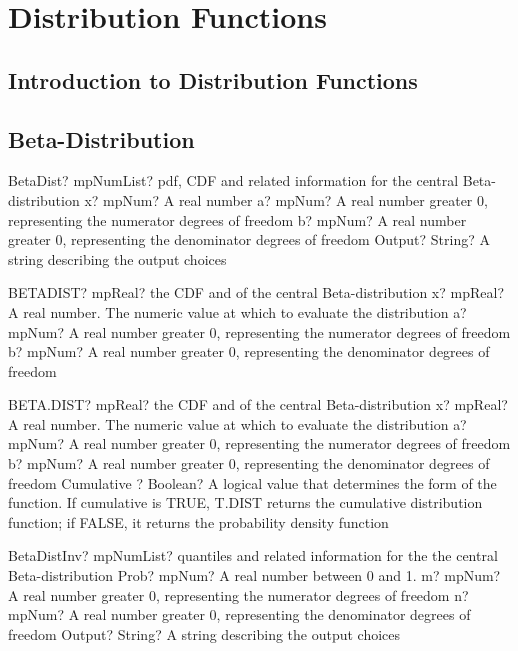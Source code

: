 \documentclass[12pt,a4paper,openany]{book}
\begin{document}
\chapter{Distribution Functions}

\section{Introduction to Distribution Functions}

\section{Beta-Distribution}

\begin{mpFunctionsExtract}
\mpFunctionFourNotImplemented
{BetaDist? mpNumList? pdf, CDF and related information for the central Beta-distribution}
{x? mpNum? A real number}
{a? mpNum? A real number greater 0, representing the numerator  degrees of freedom}
{b? mpNum? A real number greater 0, representing the denominator degrees of freedom}
{Output? String? A string describing the output choices}
\end{mpFunctionsExtract}

\begin{mpFunctionsExtract}
\mpWorksheetFunctionThreeNotImplemented
{BETADIST? mpReal? the CDF and of the central Beta-distribution}
{x? mpReal? A real number. The numeric value at which to evaluate the distribution}
{a? mpNum? A real number greater 0, representing the numerator  degrees of freedom}
{b? mpNum? A real number greater 0, representing the denominator degrees of freedom}
\end{mpFunctionsExtract}

\begin{mpFunctionsExtract}
\mpWorksheetFunctionFourNotImplemented
{BETA.DIST? mpReal? the CDF and of the central Beta-distribution}
{x? mpReal? A real number. The numeric value at which to evaluate the distribution}
{a? mpNum? A real number greater 0, representing the numerator  degrees of freedom}
{b? mpNum? A real number greater 0, representing the denominator degrees of freedom}
{Cumulative ? Boolean? A logical value that determines the form of the function. If cumulative is TRUE, T.DIST returns the cumulative distribution function; if FALSE, it returns the probability density function}
\end{mpFunctionsExtract}

\begin{mpFunctionsExtract}
\mpFunctionFourNotImplemented
{BetaDistInv? mpNumList? quantiles and related information for the the central Beta-distribution}
{Prob? mpNum? A real number between 0 and 1.}
{m? mpNum? A real number greater 0, representing the numerator  degrees of freedom}
{n? mpNum? A real number greater 0, representing the denominator degrees of freedom}
{Output? String? A string describing the output choices}
\end{mpFunctionsExtract}
\end{document}
